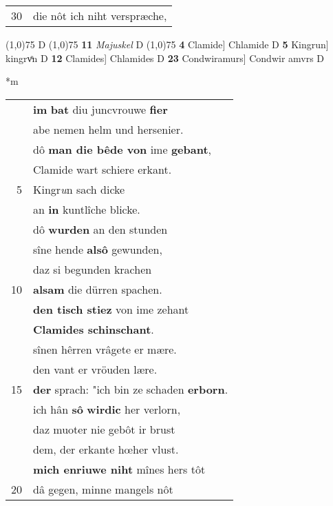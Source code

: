 \documentclass[8pt,a4paper,notitlepage]{article}
\begin{document}
\begin{table}[ht]
\begin{minipage}[t]{0.5\linewidth}
\begin{tabular}{rl}
30 & die nôt ich niht verspræche,\\ 
\end{tabular}
\scriptsize
\line(1,0){75} \newline
D \newline
\line(1,0){75} \newline
\textbf{11} \textit{Majuskel} D  \newline
\line(1,0){75} \newline
\textbf{4} Clamide] Chlamide D \textbf{5} Kingrun] kingrvͦn D \textbf{12} Clamides] Chlamides D \textbf{23} Condwiramurs] Condwir amvrs D \newline
\end{minipage}
\hspace{0.5cm}
\begin{minipage}[t]{0.5\linewidth}
\small
\begin{center}*m
\end{center}
\begin{tabular}{rl}
 & \textbf{im} \textbf{bat} diu juncvrouwe \textbf{fier}\\ 
 & abe nemen helm und hersenier.\\ 
 & dô \textbf{man die bêde von} ime \textbf{gebant},\\ 
 & Clamide wart schiere erkant.\\ 
5 & Kingr\textit{u}n sach dicke\\ 
 & an \textbf{in} kuntlîche blicke.\\ 
 & dô \textbf{wurden} an den stunden\\ 
 & sîne hende \textbf{alsô} gewunden,\\ 
 & daz si begunden krachen\\ 
10 & \textbf{alsam} die dürren spachen.\\ 
 & \textbf{den tisch stiez} von ime zehant\\ 
 & \textbf{Clamides schinschant}.\\ 
 & sînen hêrren vrâgete er mære.\\ 
 & den vant er vröuden lære.\\ 
15 & \textbf{der} sprach: "ich bin ze schaden \textbf{erborn}.\\ 
 & ich hân \textbf{sô} \textbf{wirdic} her verlorn,\\ 
 & daz muoter nie gebôt ir brust\\ 
 & dem, der erkante hœher vlust.\\ 
 & \textbf{mich enriuwe niht} mînes hers tôt\\ 
20 & dâ gegen, minne mangels nôt\\ 

\end{tabular}
\end{minipage}
\end{table}
\end{document}
